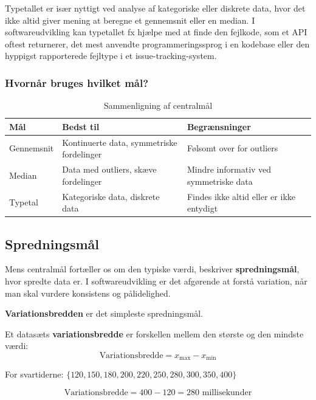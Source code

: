 Typetallet er især nyttigt ved analyse af kategoriske eller diskrete data, hvor det ikke altid giver mening at beregne et gennemsnit eller en median. I softwareudvikling kan typetallet fx hjælpe med at finde den fejlkode, som et API oftest returnerer, det mest anvendte programmeringssprog i en kodebase eller den hyppigst rapporterede fejltype i et issue-tracking-system.

\subsubsection*{Hvornår bruges hvilket mål?}

\begin{table}[htbp]
\centering
\renewcommand{\arraystretch}{1.4}
\begin{tabular}{|l|l|l|}
\hline
\textbf{Mål} & \textbf{Bedst til} & \textbf{Begrænsninger} \\
\hline
Gennemsnit & Kontinuerte data, symmetriske fordelinger & Følsomt over for outliers \\
\hline
Median & Data med outliers, skæve fordelinger & Mindre informativ ved symmetriske data \\
\hline
Typetal & Kategoriske data, diskrete data & Findes ikke altid eller er ikke entydigt \\
\hline
\end{tabular}
\caption{Sammenligning af centralmål}
\label{tab:central_tendency}
\end{table}

\subsection*{Spredningsmål}

Mens centralmål fortæller os om den typiske værdi, beskriver \textbf{spredningsmål}, hvor spredte data er. I softwareudvikling er det afgørende at forstå variation, når man skal vurdere konsistens og pålidelighed.

\textbf{Variationsbredden} er det simpleste spredningsmål.

\begin{definition}[Variationsbredde]
Et datasæts \textbf{variationsbredde} er forskellen mellem den største og den mindste værdi:
\[
\text{Variationsbredde} = x_{\max} - x_{\min}
\]
\end{definition}

\begin{example}

    For svartiderne: $\{120, 150, 180, 200, 220, 250, 280, 300, 350, 400\}$

\[
\text{Variationsbredde} = 400 - 120 = 280 \text{ millisekunder}
\]
\end{example}

